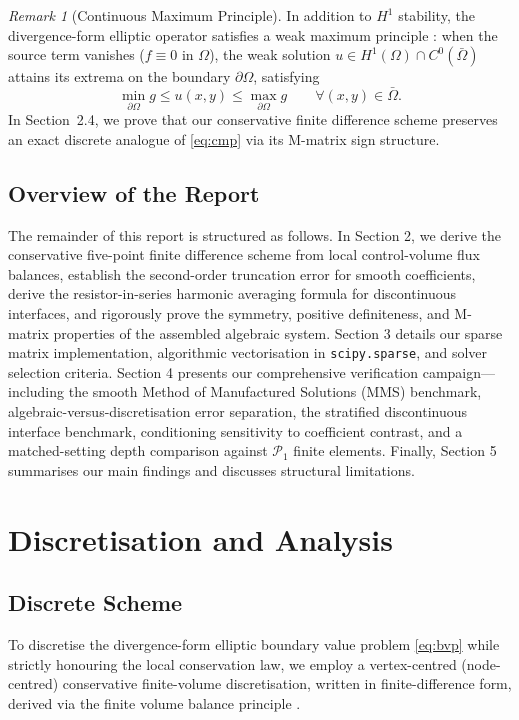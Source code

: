 \documentclass[11pt,a4paper]{article}
\theoremstyle{definition}
\theoremstyle{remark}
\newtheorem{remark}[theorem]{Remark}
\begin{document}
\begin{remark}[Continuous Maximum Principle]
\label{rem:cmp}
In addition to $H^1$ stability, the divergence-form elliptic operator satisfies a weak maximum principle \cite{hackbusch2017}: when the source term vanishes ($f \equiv 0$ in $\Omega$), the weak solution $u \in H^1(\Omega) \cap C^0(\bar{\Omega})$ attains its extrema on the boundary $\partial\Omega$, satisfying
\begin{equation}
    \min_{\partial\Omega} g \le u(x,y) \le \max_{\partial\Omega} g \qquad \forall (x,y) \in \bar{\Omega}.
    \label{eq:cmp}
\end{equation}
In Section~2.4, we prove that our conservative finite difference scheme preserves an exact discrete analogue of \eqref{eq:cmp} via its M-matrix sign structure.
\end{remark}

\subsection{Overview of the Report}
The remainder of this report is structured as follows. In Section 2, we derive the conservative five-point finite difference scheme from local control-volume flux balances, establish the second-order truncation error for smooth coefficients, derive the resistor-in-series harmonic averaging formula for discontinuous interfaces, and rigorously prove the symmetry, positive definiteness, and M-matrix properties of the assembled algebraic system. Section 3 details our sparse matrix implementation, algorithmic vectorisation in \texttt{scipy.sparse}, and solver selection criteria. Section 4 presents our comprehensive verification campaign---including the smooth Method of Manufactured Solutions (MMS) benchmark, algebraic-versus-discretisation error separation, the stratified discontinuous interface benchmark, conditioning sensitivity to coefficient contrast, and a matched-setting depth comparison against $\mathcal{P}_1$ finite elements. Finally, Section 5 summarises our main findings and discusses structural limitations.




\newpage
\section{Discretisation and Analysis}

\subsection{Discrete Scheme}
To discretise the divergence-form elliptic boundary value problem \eqref{eq:bvp} while strictly honouring the local conservation law, we employ a vertex-centred (node-centred) conservative finite-volume discretisation, written in finite-difference form, derived via the finite volume balance principle \cite{hackbusch2017, hiptmair2025}.
\end{document}
